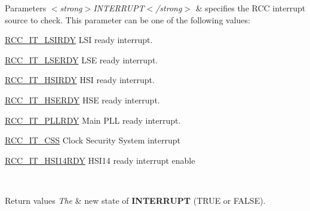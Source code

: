 \begin{DoxyParams}{Parameters}
{\em $<$strong$>$\+I\+N\+T\+E\+R\+R\+U\+P\+T$<$/strong$>$} & specifies the R\+CC interrupt source to check. This parameter can be one of the following values\+: \begin{DoxyItemize}
\item \hyperlink{group___r_c_c___interrupt_ga2b4ef277c1b71f96e0bef4b9a72fca94}{R\+C\+C\+\_\+\+I\+T\+\_\+\+L\+S\+I\+R\+DY} L\+SI ready interrupt. \item \hyperlink{group___r_c_c___interrupt_gad6b6e78a426850f595ef180d292a673d}{R\+C\+C\+\_\+\+I\+T\+\_\+\+L\+S\+E\+R\+DY} L\+SE ready interrupt. \item \hyperlink{group___r_c_c___interrupt_ga69637e51b71f73f519c8c0a0613d042f}{R\+C\+C\+\_\+\+I\+T\+\_\+\+H\+S\+I\+R\+DY} H\+SI ready interrupt. \item \hyperlink{group___r_c_c___interrupt_gad13eaede352bca59611e6cae68665866}{R\+C\+C\+\_\+\+I\+T\+\_\+\+H\+S\+E\+R\+DY} H\+SE ready interrupt. \item \hyperlink{group___r_c_c___interrupt_ga68d48e7811fb58f2649dce6cf0d823d9}{R\+C\+C\+\_\+\+I\+T\+\_\+\+P\+L\+L\+R\+DY} Main P\+LL ready interrupt. \item \hyperlink{group___r_c_c___interrupt_ga9bb34a4912d2084dc1c0834eb53aa7a3}{R\+C\+C\+\_\+\+I\+T\+\_\+\+C\+SS} Clock Security System interrupt \item \hyperlink{group___r_c_c___interrupt_ga3b85dd0ddf5c816fad2bb2c149129c01}{R\+C\+C\+\_\+\+I\+T\+\_\+\+H\+S\+I14\+R\+DY} H\+S\+I14 ready interrupt enable \end{DoxyItemize}
\\
\hline
\end{DoxyParams}

\begin{DoxyRetVals}{Return values}
{\em The} & new state of {\bfseries I\+N\+T\+E\+R\+R\+U\+PT} (T\+R\+UE or F\+A\+L\+SE). \\
\hline
\end{DoxyRetVals}
